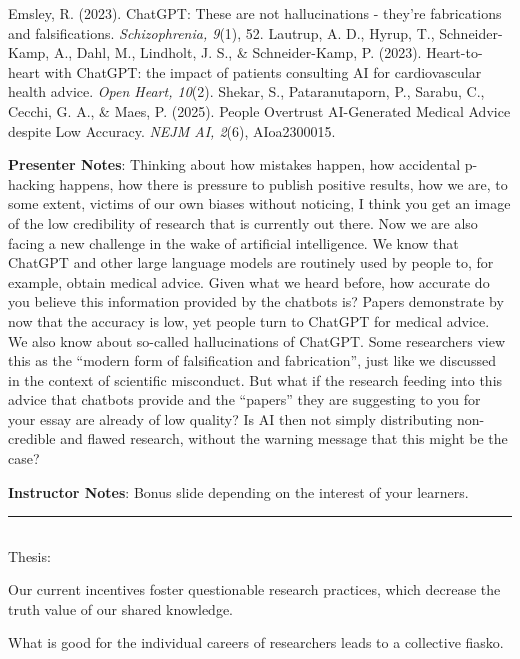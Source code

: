 \documentclass[
  english,
  letterpaper,
  DIV=11,
  numbers=noendperiod]{scrartcl}
\begin{document}
Emsley, R. (2023). ChatGPT: These are not hallucinations - they're
fabrications and falsifications. \emph{Schizophrenia, 9}(1), 52.
Lautrup, A. D., Hyrup, T., Schneider-Kamp, A., Dahl, M., Lindholt, J.
S., \& Schneider-Kamp, P. (2023). Heart-to-heart with ChatGPT: the
impact of patients consulting AI for cardiovascular health advice.
\emph{Open Heart, 10}(2). Shekar, S., Pataranutaporn, P., Sarabu, C.,
Cecchi, G. A., \& Maes, P. (2025). People Overtrust AI-Generated Medical
Advice despite Low Accuracy. \emph{NEJM AI, 2}(6), AIoa2300015.

\textbf{Presenter Notes}: Thinking about how mistakes happen, how
accidental p-hacking happens, how there is pressure to publish positive
results, how we are, to some extent, victims of our own biases without
noticing, I think you get an image of the low credibility of research
that is currently out there. Now we are also facing a new challenge in
the wake of artificial intelligence. We know that ChatGPT and other
large language models are routinely used by people to, for example,
obtain medical advice. Given what we heard before, how accurate do you
believe this information provided by the chatbots is? Papers demonstrate
by now that the accuracy is low, yet people turn to ChatGPT for medical
advice. We also know about so-called hallucinations of ChatGPT. Some
researchers view this as the ``modern form of falsification and
fabrication'', just like we discussed in the context of scientific
misconduct. But what if the research feeding into this advice that
chatbots provide and the ``papers'' they are suggesting to you for your
essay are already of low quality? Is AI then not simply distributing
non-credible and flawed research, without the warning message that this
might be the case?

\textbf{Instructor Notes}: Bonus slide depending on the interest of your
learners.

\begin{center}\rule{0.5\linewidth}{0.5pt}\end{center}

\subsection{}\label{section}

Thesis:

Our current incentives foster questionable research practices, which
decrease the truth value of our shared knowledge.

What is good for the individual careers of researchers leads to a
collective fiasko.
\end{document}
